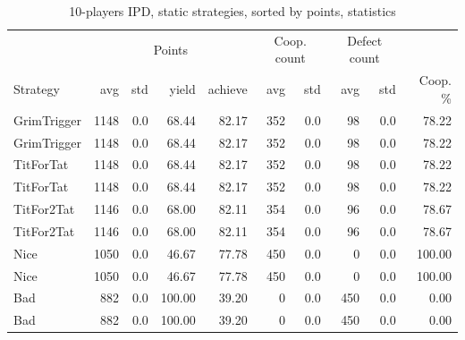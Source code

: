 \documentclass[journal,10pt,twoside]{IEEEtran}
\begin{document}
\begin{table}[ht]

	\caption{10-players IPD, static strategies, sorted by points, statistics}
	\label{tab:ipdmp10stat}
	\centering
	\begin{tabular}{l|rrrr|rrrrr}
		\toprule
		            &  \multicolumn{4}{c}{Points}   & \multicolumn{2}{c}{Coop. count} & \multicolumn{2}{c}{Defect count} &          \\
		Strategy    &  avg & std &  yield & achieve & avg &                       std & avg &                        std & Coop. \% \\
		\midrule
		GrimTrigger & 1148 & 0.0 &  68.44 &   82.17 & 352 &                       0.0 &  98 &                        0.0 &    78.22 \\
		GrimTrigger & 1148 & 0.0 &  68.44 &   82.17 & 352 &                       0.0 &  98 &                        0.0 &    78.22 \\
		TitForTat   & 1148 & 0.0 &  68.44 &   82.17 & 352 &                       0.0 &  98 &                        0.0 &    78.22 \\
		TitForTat   & 1148 & 0.0 &  68.44 &   82.17 & 352 &                       0.0 &  98 &                        0.0 &    78.22 \\
		TitFor2Tat  & 1146 & 0.0 &  68.00 &   82.11 & 354 &                       0.0 &  96 &                        0.0 &    78.67 \\
		TitFor2Tat  & 1146 & 0.0 &  68.00 &   82.11 & 354 &                       0.0 &  96 &                        0.0 &    78.67 \\
		Nice        & 1050 & 0.0 &  46.67 &   77.78 & 450 &                       0.0 &   0 &                        0.0 &   100.00 \\
		Nice        & 1050 & 0.0 &  46.67 &   77.78 & 450 &                       0.0 &   0 &                        0.0 &   100.00 \\
		Bad         &  882 & 0.0 & 100.00 &   39.20 &   0 &                       0.0 & 450 &                        0.0 &     0.00 \\
		Bad         &  882 & 0.0 & 100.00 &   39.20 &   0 &                       0.0 & 450 &                        0.0 &     0.00 \\
		\bottomrule
	\end{tabular}
\end{table}
\end{document}
